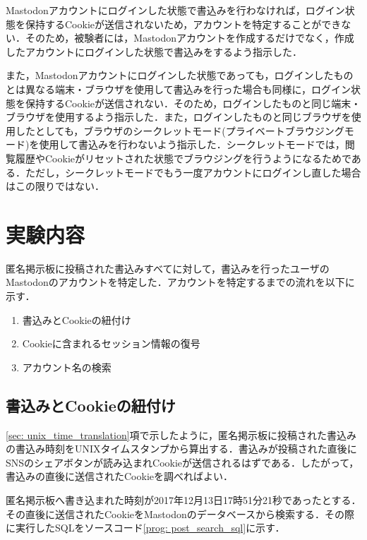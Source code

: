 \documentclass[10pt, a4paper]{jreport}
\begin{document}
Mastodonアカウントにログインした状態で書込みを行わなければ，ログイン状態を保持するCookieが送信されないため，アカウントを特定することができない．そのため，被験者には，Mastodonアカウントを作成するだけでなく，作成したアカウントにログインした状態で書込みをするよう指示した．

また，Mastodonアカウントにログインした状態であっても，ログインしたものとは異なる端末・ブラウザを使用して書込みを行った場合も同様に，ログイン状態を保持するCookieが送信されない．そのため，ログインしたものと同じ端末・ブラウザを使用するよう指示した．また，ログインしたものと同じブラウザを使用したとしても，ブラウザのシークレットモード(プライベートブラウジングモード)を使用して書込みを行わないよう指示した．シークレットモードでは，閲覧履歴やCookieがリセットされた状態でブラウジングを行うようになるためである．ただし，シークレットモードでもう一度アカウントにログインし直した場合はこの限りではない．

\section{実験内容}\label{sec: exp_flow}
匿名掲示板に投稿された書込みすべてに対して，書込みを行ったユーザのMastodonのアカウントを特定した．アカウントを特定するまでの流れを以下に示す．

\begin{enumerate}
\item{書込みとCookieの紐付け}
\item{Cookieに含まれるセッション情報の復号}
\item{アカウント名の検索}
\end{enumerate}

\subsection{書込みとCookieの紐付け}
\ref{sec: unix_time_translation}項で示したように，匿名掲示板に投稿された書込みの書込み時刻をUNIXタイムスタンプから算出する．書込みが投稿された直後にSNSのシェアボタンが読み込まれCookieが送信されるはずである．したがって，書込みの直後に送信されたCookieを調べればよい．

匿名掲示板へ書き込まれた時刻が2017年12月13日17時51分21秒であったとする．その直後に送信されたCookieをMastodonのデータベースから検索する．その際に実行したSQLをソースコード\ref{prog: post_search_sql}に示す．
\end{document}
